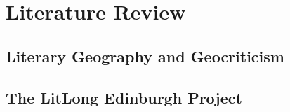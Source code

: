 \documentclass[logo,msc]{infthesis}
\begin{document}
\chapter{Literature Review}

\section{Literary Geography and Geocriticism}
%
%

\section{The LitLong Edinburgh Project}
%
\end{document}
